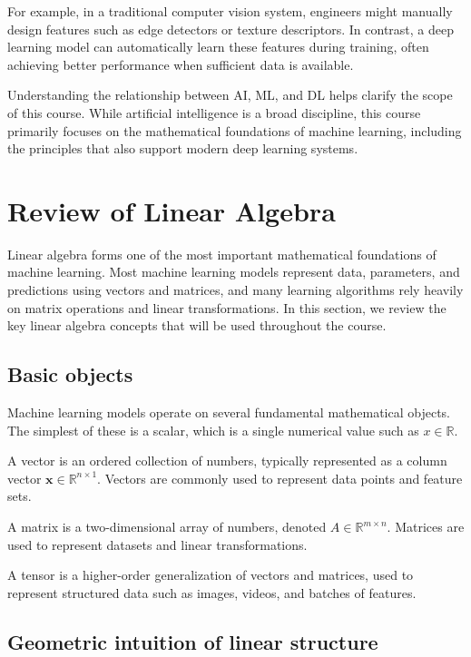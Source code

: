 \documentclass{article}
\begin{document}
For example, in a traditional computer vision system, engineers might manually design features such as edge detectors or texture descriptors. In contrast, a deep learning model can automatically learn these features during training, often achieving better performance when sufficient data is available.

Understanding the relationship between AI, ML, and DL helps clarify the scope of this course. While artificial intelligence is a broad discipline, this course primarily focuses on the mathematical foundations of machine learning, including the principles that also support modern deep learning systems.

\section{Review of Linear Algebra}

Linear algebra forms one of the most important mathematical foundations of machine learning. Most machine learning models represent data, parameters, and predictions using vectors and matrices, and many learning algorithms rely heavily on matrix operations and linear transformations. In this section, we review the key linear algebra concepts that will be used throughout the course.

\subsection{Basic objects}

Machine learning models operate on several fundamental mathematical objects. The simplest of these is a scalar, which is a single numerical value such as $x \in \mathbb{R}$.

A vector is an ordered collection of numbers, typically represented as a column vector $\mathbf{x} \in \mathbb{R}^{n \times 1}$. Vectors are commonly used to represent data points and feature sets.

A matrix is a two-dimensional array of numbers, denoted $A \in \mathbb{R}^{m \times n}$. Matrices are used to represent datasets and linear transformations.

A tensor is a higher-order generalization of vectors and matrices, used to represent structured data such as images, videos, and batches of features.

\subsection{Geometric intuition of linear structure}
\end{document}
